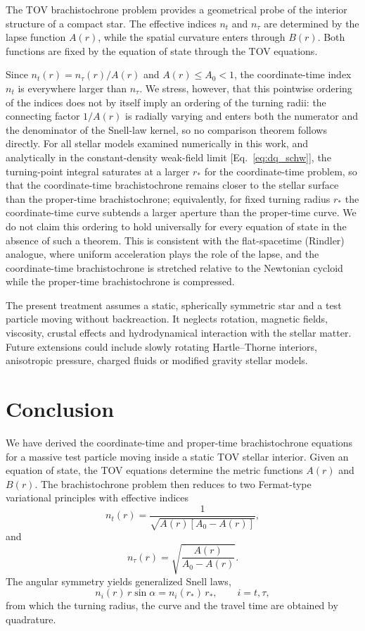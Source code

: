 \documentclass[
  aps,
  prd,
  twocolumn,
  nofootinbib,
  superscriptaddress,
  longbibliography
]{revtex4-2}
\begin{document}
The TOV brachistochrone problem provides a geometrical probe of the
interior structure of a compact star. The effective indices $n_t$ and
$n_\tau$ are determined by the lapse function $A(r)$, while the
spatial curvature enters through $B(r)$. Both functions are fixed by
the equation of state through the TOV equations.

Since $n_t(r)=n_\tau(r)/A(r)$ and $A(r)\leq A_0<1$, the
coordinate-time index $n_t$ is everywhere larger than $n_\tau$.
We stress, however, that this pointwise ordering of the indices does
not by itself imply an ordering of the turning radii: the connecting
factor $1/A(r)$ is radially varying and enters both the numerator and
the denominator of the Snell-law kernel, so no comparison theorem
follows directly. For all stellar models examined numerically in this
work, and analytically in the constant-density weak-field limit
[Eq.~\eqref{eq:dq_schw}], the turning-point integral saturates at a
larger $r_*$ for the coordinate-time problem, so that the
coordinate-time brachistochrone remains closer to the stellar surface
than the proper-time brachistochrone; equivalently, for fixed turning
radius $r_*$ the coordinate-time curve subtends a larger aperture than
the proper-time curve. We do not claim this ordering to hold
universally for every equation of state in the absence of such a
theorem. This is consistent with the flat-spacetime (Rindler) analogue,
where uniform acceleration plays the role of the lapse,
and the coordinate-time brachistochrone is stretched relative
to the Newtonian cycloid while the proper-time brachistochrone
is compressed.


The present treatment assumes a static, spherically symmetric star and
a test particle moving without backreaction. It neglects rotation,
magnetic fields, viscosity, crustal effects and hydrodynamical
interaction with the stellar matter. Future extensions could include
slowly rotating Hartle--Thorne interiors, anisotropic pressure,
charged fluids or modified gravity stellar models.

\section{Conclusion}

We have derived the coordinate-time and proper-time brachistochrone
equations for a massive test particle moving inside a static TOV
stellar interior. Given an equation of state, the TOV equations
determine the metric functions $A(r)$ and $B(r)$. The brachistochrone
problem then reduces to two Fermat-type variational principles with
effective indices
\begin{equation}
n_t(r)
=
\frac{1}
{\sqrt{
A(r)\left[A_0-A(r)\right]
}},
\end{equation}
and
\begin{equation}
n_\tau(r)
=
\sqrt{
\frac{A(r)}{A_0-A(r)}
}.
\end{equation}
The angular symmetry yields generalized Snell laws,
\begin{equation}
n_i(r)\,r\sin\alpha
=
n_i(r_*)\,r_*,
\qquad
i=t,\tau,
\end{equation}
from which the turning radius, the curve and the travel time are
obtained by quadrature.
\end{document}
